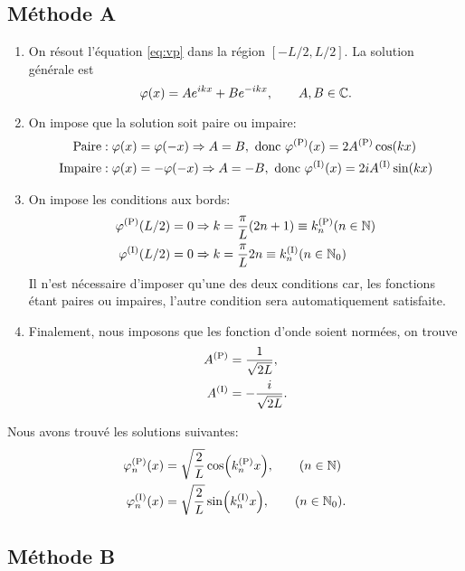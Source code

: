 \documentclass[11pt,a4paper,oneside]{article}
\begin{document}
\subsection{Méthode A}

\begin{enumerate}
    \item On résout l'équation \eqref{eq:vp} dans la région $[-L/2,L/2]$. La solution générale est
    \begin{equation}
        \varphi(x)=Ae^{ikx}+Be^{-ikx},\qquad A,B\in\mathbb{C}.
    \end{equation}
    \item On impose que la solution soit paire ou impaire:
    \begin{align}
        \text{Paire} &: \varphi(x)=\varphi(-x) \Rightarrow A=B,\text{ donc } \varphi^{(\text{P})}(x) = 2A^{(\text{P})}\cos(kx)\\
        \text{Impaire} &: \varphi(x)=-\varphi(-x) \Rightarrow A=-B,\text{ donc } \varphi^{(\text{I})}(x) = 2iA^{(\text{I})}\sin(kx)
    \end{align}
    \item On impose les conditions aux bords:
    \begin{align}
        \varphi^{(\text{P})}(L/2)&=0 \Rightarrow k=\frac{\pi}{L}(2n+1)\equiv k^{(\text{P})}_n (n\in\mathbb{N})\\
        \varphi^{(\text{I})}(L/2)&=0 \Rightarrow k=\frac{\pi}{L}2n\equiv k^{(\text{I})}_n (n\in\mathbb{N}_0)
    \end{align}
    Il n'est nécessaire d'imposer qu'une des deux conditions car, les fonctions étant paires ou impaires, l'autre condition sera automatiquement satisfaite.
    \item Finalement, nous imposons que les fonction d'onde soient normées, on trouve
    \begin{align}
        A^{(\text{P})} &= \frac{1}{\sqrt{2L}},\\
        A^{(\text{I})} &= -\frac{i}{\sqrt{2L}}.
    \end{align}
\end{enumerate}
Nous avons trouvé les solutions suivantes:
\begin{align}
    \varphi_n^{(\text{P})}(x) &= \sqrt{\frac{2}{L}}\cos(k^{(\text{P})}_nx),\qquad (n\in\mathbb{N})\label{eq:solf1}\\
    \varphi_n^{(\text{I})}(x) &= \sqrt{\frac{2}{L}}\sin(k^{(\text{I})}_nx),\qquad (n\in\mathbb{N}_0).\label{eq:solf2}
\end{align}

\subsection{Méthode B}
\end{document}
